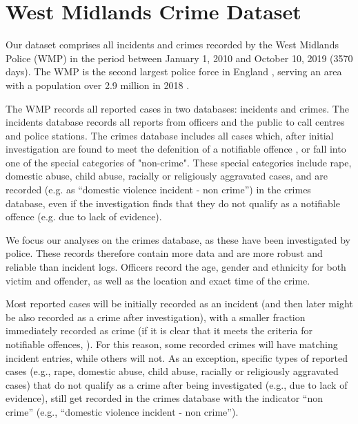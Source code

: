 \documentclass[12pt, a4paper]{article}
\begin{document}
\section{West Midlands Crime Dataset}


Our dataset comprises all incidents and crimes recorded by the West Midlands Police (WMP) in the period between January 1, 2010 and October 10, 2019 (3570 days). The WMP is the second largest police force in England \cite{Homeoffice}, serving an area with a population over 2.9 million in 2018 \cite{populationfigure}. 

The WMP records all reported cases in two databases: incidents and crimes. The incidents database records all reports from officers and the public to call centres and police stations. The crimes database includes all cases which, after initial investigation are found to meet the defenition of a notifiable offence , or fall into one of the special categories of "non-crime". These special categories include rape, domestic abuse, child abuse, racially or religiously aggravated cases, and are recorded (e.g. as ``domestic violence incident - non crime'') in the crimes database, even if the investigation finds that they do not qualify as a notifiable offence (e.g. due to lack of evidence).
 
We focus our analyses on the crimes database, as these have been investigated by police. These records therefore contain more data and are more robust and reliable than incident logs. Officers record the age, gender and ethnicity for both victim and offender, as well as the location and exact time of the crime. 
 
 
 
 
 
Most reported cases will be initially recorded as an incident (and then later might be also recorded as a crime after investigation), with a smaller fraction immediately recorded as crime (if it is clear that it meets the criteria for notifiable offences,  ). For this reason, some recorded crimes will have matching incident entries, while others will not. As an exception, specific types of reported cases (e.g., rape, domestic abuse, child abuse, racially or religiously aggravated cases) that do not qualify as a crime after being investigated (e.g., due to lack of evidence), still get recorded in the crimes database with the indicator ``non crime'' (e.g., ``domestic violence incident - non crime'').
\end{document}
